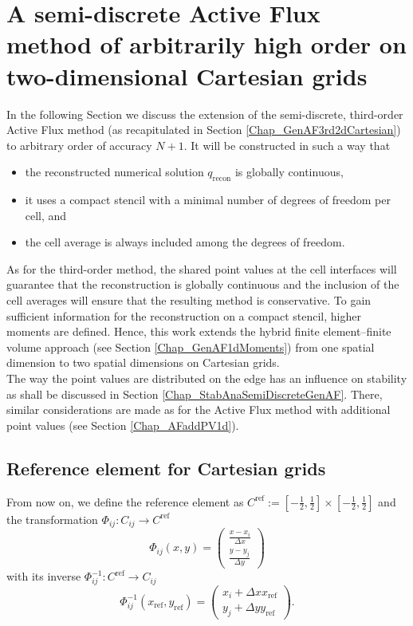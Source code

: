 \documentclass[12pt,a4paper]{article}
\begin{document}
\section{A semi-discrete Active Flux method of arbitrarily high order on two-dimensional Cartesian grids}
\label{Chap_GenAF2DCartesian}
In the following Section we discuss the extension of the semi-discrete, third-order Active Flux method (as recapitulated in Section \ref{Chap_GenAF3rd2dCartesian}) to arbitrary order of accuracy $N+1$. It will be constructed in such a way that 
\begin{itemize}
	\item the reconstructed numerical solution \(q_\mathrm{recon}\) is globally continuous,
	\item it uses a compact stencil with a minimal number of degrees of freedom per cell, and
	\item the cell average is always included among the degrees of freedom.
\end{itemize}
As for the third-order method, the shared point values at the cell interfaces will guarantee that the reconstruction is globally continuous and the inclusion of the cell averages will ensure that the resulting method is conservative. To gain sufficient information for the reconstruction on a compact stencil, higher moments are defined. Hence, this work extends the hybrid finite element--finite volume approach (see Section \ref{Chap_GenAF1dMoments}) from one spatial dimension to two spatial dimensions on Cartesian grids.\\
The way the point values are distributed on the edge has an influence on stability as shall be discussed in Section \ref{Chap_StabAnaSemiDiscreteGenAF}. There, similar considerations are made as for the Active Flux method with additional point values (see Section \ref{Chap_AFaddPV1d}).



\subsection{Reference element for Cartesian grids}
From now on, we define the reference element as \(C^\mathrm{ref} := \left[-\frac12, \frac12\right]\times\left[-\frac12,\frac12\right]\) and the transformation \(\Phi_{ij}: C_{ij} \rightarrow C^\mathrm{ref}\)
\begin{equation}
\Phi_{ij}(x,y) = \left(\begin{array}{c} \frac{x-x_i}{\Delta x}\\
						      \frac{y-y_j}{\Delta y}\end{array}\right)
\end{equation}
with its inverse \(\Phi_{ij}^{-1}: C^\mathrm{ref} \rightarrow C_{ij}\) 
\begin{equation}
\Phi_{ij}^{-1}(x_\mathrm{ref},y_\mathrm{ref}) = \left(\begin{array}{c} {x_i + \Delta x x_\mathrm{ref}}\\
												{y_j + \Delta y y_\mathrm{ref}}\end{array}\right).
\end{equation}
\end{document}
